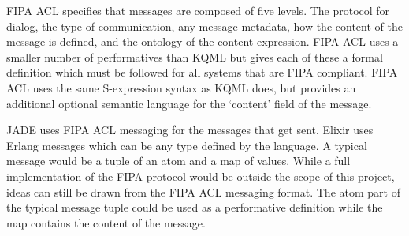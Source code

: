 FIPA ACL specifies that messages are composed of five levels.
The protocol for dialog, the type of communication, any message metadata, how the content of the message is defined, and the ontology of the content expression.
FIPA ACL uses a smaller number of performatives than KQML but gives each of these a formal definition which must be followed for all systems that are FIPA compliant.
FIPA ACL uses the same S-expression syntax as KQML does, but provides an additional optional semantic language for the `content' field of the message.~\cite{obrien1998fipa}

JADE uses FIPA ACL messaging for the messages that get sent.
Elixir uses Erlang messages which can be any type defined by the language.
A typical message would be a tuple of an atom and a map of values.
While a full implementation of the FIPA protocol would be outside the scope of this project, ideas can still be drawn from the FIPA ACL messaging format.
The atom part of the typical message tuple could be used as a performative definition while the map contains the content of the message.
